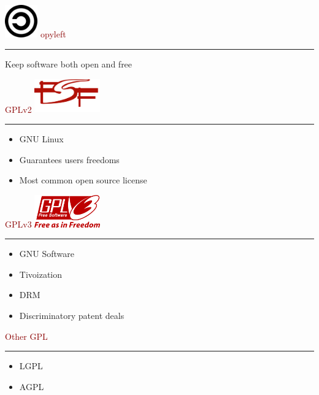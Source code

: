 \documentclass[c]{beamer}
\newcommand{\TITLE}{\fontsize{50pt}{1em}\selectfont}
\begin{document}
  \begin{frame}
    \includegraphics[width=40pt]{copyleft}
    \textcolor{darkred}{{\TITLE opyleft \\}}
    \vspace{1em} \hrule \vspace{1em}
    {\fontsize{20pt}{1em}\selectfont Keep software both open and free}
  \end{frame}
  \begin{frame}
    \textcolor{darkred}{{\TITLE GPLv2}}
    \hfill \includegraphics[width=80pt,trim = 0px 150px 0px 0px]{fsf} \\
    \vspace{1em} \hrule \vspace{1em}
    \LARGE
    \begin{itemize}
    \item GNU Linux
    \item Guarantees users freedoms
    \item Most common open source license
    \end{itemize}
  \end{frame}
  \begin{frame}
    \textcolor{darkred}{{\TITLE GPLv3}}
    \hfill \includegraphics[width=80pt]{gplv3} \\
    \vspace{1em} \hrule \vspace{1em}
    \LARGE
    \begin{itemize}
    \item GNU Software
    \item Tivoization
    \item DRM
    \item Discriminatory patent deals
     \end{itemize}
  \end{frame}
  \begin{frame}
    \textcolor{darkred}{{\TITLE Other GPL  \\}}
    \vspace{1em} \hrule \vspace{1em}
    \LARGE
    \begin{itemize}
      \item LGPL
      \item AGPL
    \end{itemize}
  \end{frame}
\end{document}
